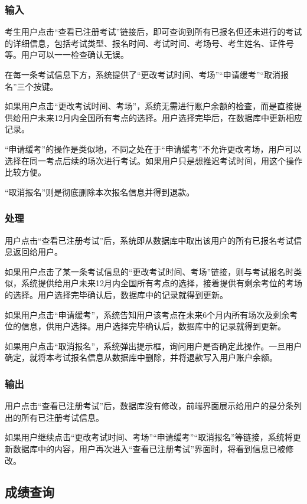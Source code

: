 \subsubsection{输入}
考生用户点击“查看已注册考试”链接后，即可查询到所有已报名但还未进行的考试的详细信息，包括考试类型、报名时间、考试时间、考场号、考生姓名、证件号等。用户可以一一检查确认无误。

在每一条考试信息下方，系统提供了“更改考试时间、考场”“申请缓考”“取消报名”三个按键。

如果用户点击“更改考试时间、考场”，系统无需进行账户余额的检查，而是直接提供给用户未来12月内全国所有考点的选择。用户选择完毕后，在数据库中更新相应记录。

“申请缓考”的操作是类似地，不同之处在于“申请缓考”不允许更改考场，用户可以选择在同一考点后续的场次进行考试。如果用户只是想推迟考试时间，用这个操作比较方便。

“取消报名”则是彻底删除本次报名信息并得到退款。

\subsubsection{处理}
用户点击“查看已注册考试”后，系统即从数据库中取出该用户的所有已报名考试信息返回给用户。

如果用户点击了某一条考试信息的“更改考试时间、考场”链接，则与考试报名时类似，系统提供给用户未来12月内全国所有考点的选择，接着提供有剩余考位的考场的选择。用户选择完毕确认后，数据库中的记录就得到更新。

如果用户点击“申请缓考”，系统告知用户该考点在未来6个月内所有场次及剩余考位的信息，供用户选择。用户选择完毕确认后，数据库中的记录就得到更新。

如果用户点击“取消报名”，系统弹出提示框，询问用户是否确定此操作。一旦用户确定，就将本考试报名信息从数据库中删除，并将退款写入用户账户余额。

\subsubsection{输出}
用户点击“查看已注册考试”后，数据库没有修改，前端界面展示给用户的是分条列出的所有已注册考试信息。

如果用户继续点击“更改考试时间、考场”“申请缓考”“取消报名”等链接，系统将更新数据库中的内容，用户再次进入“查看已注册考试”界面时，将看到信息已被修改。

\subsection{成绩查询}

